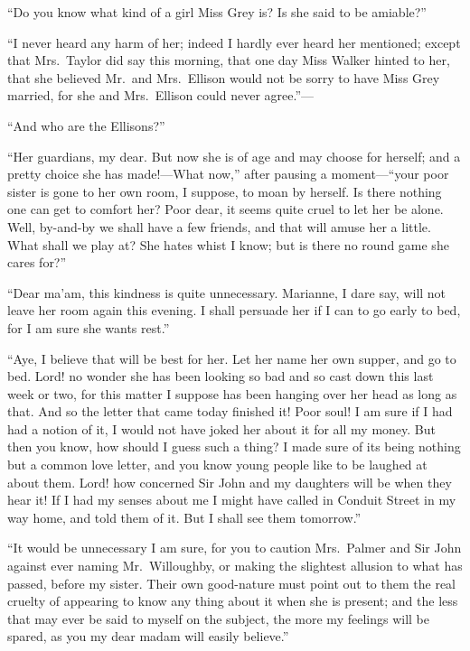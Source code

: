 \documentclass{article}
\begin{document}
``Do you know what kind of a girl Miss Grey is?
Is she said to be amiable?''

``I never heard any harm of her; indeed I hardly ever
heard her mentioned; except that Mrs.\ Taylor did say
this morning, that one day Miss Walker hinted to her,
that she believed Mr.\ and Mrs.\ Ellison would not be sorry
to have Miss Grey married, for she and Mrs.\ Ellison could
never agree.''---%

``And who are the Ellisons?''

``Her guardians, my dear.  But now she is of age
and may choose for herself; and a pretty choice she has
made!---What now,'' after pausing a moment---``your poor sister
is gone to her own room, I suppose, to moan by herself.
Is there nothing one can get to comfort her?  Poor dear,
it seems quite cruel to let her be alone.  Well, by-and-by we
shall have a few friends, and that will amuse her a little.
What shall we play at?  She hates whist I know; but is there
no round game she cares for?''

``Dear ma'am, this kindness is quite unnecessary.
Marianne, I dare say, will not leave her room again
this evening.  I shall persuade her if I can to go
early to bed, for I am sure she wants rest.''

``Aye, I believe that will be best for her.  Let her name
her own supper, and go to bed.  Lord! no wonder she has
been looking so bad and so cast down this last week or two,
for this matter I suppose has been hanging over her head as
long as that.  And so the letter that came today finished it!
Poor soul!  I am sure if I had had a notion of it,
I would not have joked her about it for all my money.
But then you know, how should I guess such a thing?  I made
sure of its being nothing but a common love letter, and
you know young people like to be laughed at about them.  Lord!
how concerned Sir John and my daughters will be when they
hear it!  If I had my senses about me I might have called
in Conduit Street in my way home, and told them of it.
But I shall see them tomorrow.''

``It would be unnecessary I am sure, for you to caution
Mrs.\ Palmer and Sir John against ever naming Mr.\ Willoughby,
or making the slightest allusion to what has passed,
before my sister.  Their own good-nature must point out
to them the real cruelty of appearing to know any thing
about it when she is present; and the less that may ever
be said to myself on the subject, the more my feelings
will be spared, as you my dear madam will easily believe.''
\end{document}
